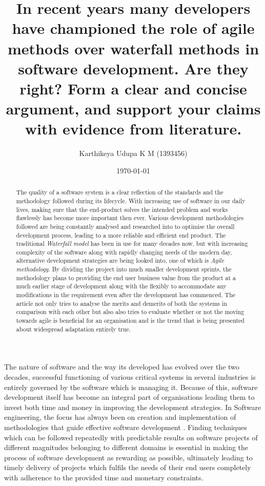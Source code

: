 \documentclass[12pt]{article}
\title{In recent years many developers have championed the role of agile methods over waterfall methods in software development. Are they right? Form a clear and concise argument, and support your claims with evidence from literature.}
\author{Karthikeya Udupa K M (1393456)}
\date{\today}
\begin{document}
\maketitle


\begin{abstract}

The quality of a software system is a clear reflection of the standards and  the methodology followed during its lifecycle. With increasing use of software in our daily lives, making sure that the end-product solves the intended problem and works flawlessly has become more important then ever. Various development methodologies followed are being constantly analysed and researched into to optimise the overall development process, leading to a more reliable and efficient end product. The traditional \textit{Waterfall model} has been in use for many decades now, but with increasing complexity of the software along with rapidly changing needs of the modern day, alternative development strategies are being looked into, one of which is \textit{Agile methodology}. By dividing the project into much smaller development sprints, the methodology plans to providing the end user business value from the product at a much earlier stage of development along with the flexibly to accommodate any modifications in the requirement even after the development has commenced. The article not only tries to analyse the merits and demerits of both the systems in comparison with each other but also also tries to evaluate whether or not the moving towards agile is beneficial for an organisation and is the trend that is being presented about widespread adaptation entirely true.   


\end{abstract}


\noindent

The nature of software and the way its developed has evolved over the two decades, successful functioning of various critical systems in several industries is entirely governed by the software which is managing it. Because of this, software development itself has become an integral part of organisations leading them to invest both time and money in improving the development strategies. In Software engineering, the focus has always been on creation and implementation of methodologies that guide effective software development \cite{davis1988strategy}. Finding techniques which can be followed repeatedly with predictable results on software projects of different magnitudes belonging to different domains is essential in making the process of software development as rewarding as possible, ultimately leading to timely delivery of projects which fulfils the needs of their end users completely with adherence to the provided time and monetary constraints. 
\end{document}
